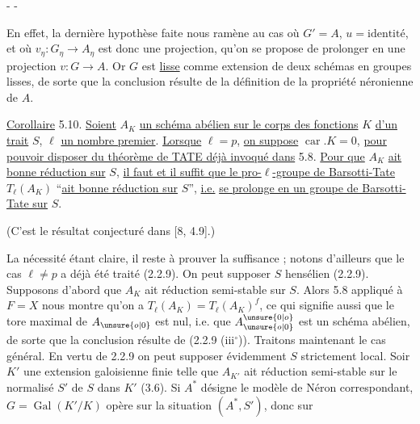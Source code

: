 \begin{center}-  -\end{center}

En effet, la dernière hypothèse faite nous ramène au cas où $G'=A$, $u=\text{identité}$, et où $v_\eta:G_\eta\longrightarrow A_\eta$ est donc une projection, qu'on se propose de prolonger en une projection $v:G\longrightarrow A$. Or $G$ est \uline{lisse} comme extension de deux schémas en groupes lisses, de sorte que la conclusion résulte de la définition de la propriété néronienne de $A$.

\uline{Corollaire} 5.10. \uline{Soient} $A_K$ \uline{un schéma abélien sur le corps des fonctions} $K$ \uline{d'un trait} $S$, $\ell$ \uline{un nombre premier}. \uline{Lorsque} $\ell=p$, \uline{on suppose} $\operatorname{car}.K=0$, \uline{pour pouvoir disposer du théorème de TATE déjà invoqué dans} 5.8. \uline{Pour que} $A_K$ \uline{ait bonne réduction sur} $S$, \uline{il faut et il suffit que le pro-$\ell$-groupe de Barsotti-Tate} $T_\ell(A_K)$ ``\uline{ait bonne réduction sur} $S$'', \uline{i.e.} \uline{se prolonge en un groupe de Barsotti-Tate sur} $S$.

(C'est le résultat conjecturé dans [8, 4.9].)

La nécessité étant claire, il reste à prouver la suffisance ; notons d'ailleurs que le cas $\ell\neq p$ a déjà été traité (2.2.9). On peut supposer $S$ hensélien (2.2.9). Supposons d'abord que $A_K$ ait réduction semi-stable sur $S$. Alors 5.8 appliqué à $F=X$ nous montre qu'on a $T_\ell(A_K)=T_\ell(A_K)^f$, ce qui signifie aussi que le tore maximal de $A_{\unsure{o|0}}$ est nul, i.e. que $A_{\unsure{o|0}}^{\unsure{0|o}}$ est un schéma abélien, de sorte que la conclusion résulte de (2.2.9 (iii$^\circ$)). Traitons maintenant le cas général. En vertu de 2.2.9 on peut supposer évidemment $S$ strictement local. Soir $K'$ une extension galoisienne finie telle que $A_{K'}$ ait réduction semi-stable sur le normalisé $S'$ de $S$ dans $K'$ (3.6). Si $A^*$ désigne le modèle de Néron correspondant, $G=\operatorname{Gal}(K'/K)$ opère sur la situation $(A^*,S')$, donc sur

